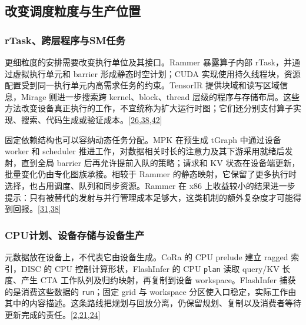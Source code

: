 \documentclass[
  UTF8,
  zihao=5]{ctexart}
\begin{document}
\hypertarget{ux6539ux53d8ux8c03ux5ea6ux7c92ux5ea6ux4e0eux751fux4ea7ux4f4dux7f6e}{%
\subsection{改变调度粒度与生产位置}\label{ux6539ux53d8ux8c03ux5ea6ux7c92ux5ea6ux4e0eux751fux4ea7ux4f4dux7f6e}}

\hypertarget{rtaskux8de8ux5c42ux7a0bux5e8fux4e0esmux4efbux52a1}{%
\subsubsection{rTask、跨层程序与SM任务}\label{rtaskux8de8ux5c42ux7a0bux5e8fux4e0esmux4efbux52a1}}

更细粒度的安排需要改变执行单位及其接口。Rammer 暴露算子内部
rTask，并通过虚拟执行单元和 barrier 形成静态时空计划；CUDA
实现使用持久线程块，资源配置受到同一执行单元内高需求任务的约束。TensorIR
提供块域和读写区域信息，Mirage 则进一步搜索跨 kernel、block、thread
层级的程序与存储布局。这些方法改变设备真正执行的工作，不宜统称为扩大运行时图；它们还分别支付算子实现、搜索、代码生成或验证成本。{[}\protect\hyperlink{ref-feng2023tensorir}{26},\protect\hyperlink{ref-ma2020rammer}{38},\protect\hyperlink{ref-wu2025mirage}{42}{]}

固定依赖结构也可以容纳动态任务分配。MPK 在预生成 tGraph 中通过设备
worker 和 scheduler
推进工作，对数据相关时长的注意力及其下游采用就绪后发射，直到全局 barrier
后再允许提前入队的策略；请求和 KV
状态在设备端更新，批量变化仍由专化图族承接。相较于 Rammer
的静态映射，它保留了更多执行时选择，也占用调度、队列和同步资源。Rammer
在 x86
上收益较小的结果进一步提示：只有被替代的发射与并行管理成本足够大，这类机制的额外复杂度才可能得到回报。{[}\protect\hyperlink{ref-cheng2026mpk}{31},\protect\hyperlink{ref-ma2020rammer}{38}{]}

\hypertarget{cpuux8ba1ux5212ux8bbeux5907ux5b58ux50a8ux4e0eux8bbeux5907ux751fux4ea7}{%
\subsubsection{CPU计划、设备存储与设备生产}\label{cpuux8ba1ux5212ux8bbeux5907ux5b58ux50a8ux4e0eux8bbeux5907ux751fux4ea7}}

元数据放在设备上，不代表它由设备生成。CoRa 的 CPU prelude 建立 ragged
索引，DISC 的 CPU 控制计算形状，FlashInfer 的 CPU \texttt{plan} 读取
query/KV 长度、产生 CTA 工作队列及归约映射，再复制到设备
workspace。FlashInfer 捕获的是消费这些数据的 \texttt{run}；固定 grid 与
workspace
分区使入口稳定，实际工作由其中的内容描述。这条路线把规划与回放分离，仍保留规划、复制以及消费者等待更新完成的责任。{[}\protect\hyperlink{ref-ye2025flashinfer}{2},\protect\hyperlink{ref-zhu2021disc}{21},\protect\hyperlink{ref-fegade2022cora}{24}{]}
\end{document}
